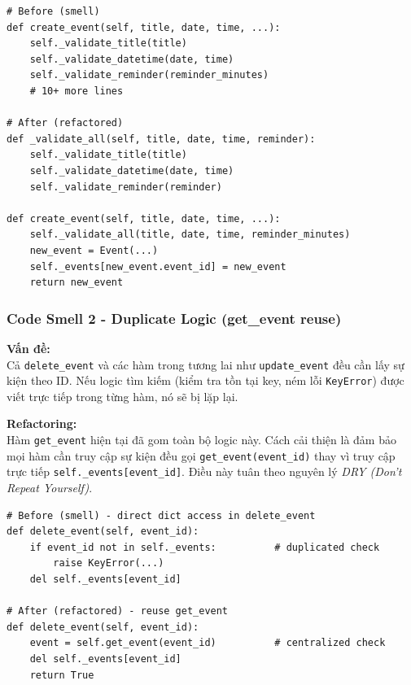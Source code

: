 \begin{lstlisting}[style=python]
# Before (smell)
def create_event(self, title, date, time, ...):
    self._validate_title(title)
    self._validate_datetime(date, time)
    self._validate_reminder(reminder_minutes)
    # 10+ more lines 

# After (refactored)
def _validate_all(self, title, date, time, reminder):
    self._validate_title(title)
    self._validate_datetime(date, time)
    self._validate_reminder(reminder)

def create_event(self, title, date, time, ...):
    self._validate_all(title, date, time, reminder_minutes)
    new_event = Event(...)
    self._events[new_event.event_id] = new_event
    return new_event
\end{lstlisting}

\subsubsection{Code Smell 2 - Duplicate Logic (get\_event reuse)}
\noindent\textbf{Vấn đề:} \\
Cả \texttt{delete\_event} và các hàm trong tương lai như \texttt{update\_event} đều cần lấy sự kiện theo ID. Nếu logic tìm kiếm (kiểm tra tồn tại key, ném lỗi \texttt{KeyError}) được viết trực tiếp trong từng hàm, nó sẽ bị lặp lại.

\vspace{6pt}

\noindent\textbf{Refactoring:} \\
Hàm \texttt{get\_event} hiện tại đã gom toàn bộ logic này. Cách cải thiện là đảm bảo mọi hàm cần truy cập sự kiện đều gọi \texttt{get\_event(event\_id)} thay vì truy cập trực tiếp \texttt{self.\_events[event\_id]}. Điều này tuân theo nguyên lý \textit{DRY (Don't Repeat Yourself)}.

\begin{lstlisting}[style=python]
# Before (smell) - direct dict access in delete_event
def delete_event(self, event_id):
    if event_id not in self._events:          # duplicated check
        raise KeyError(...)
    del self._events[event_id]

# After (refactored) - reuse get_event
def delete_event(self, event_id):
    event = self.get_event(event_id)          # centralized check
    del self._events[event_id]
    return True
\end{lstlisting}
